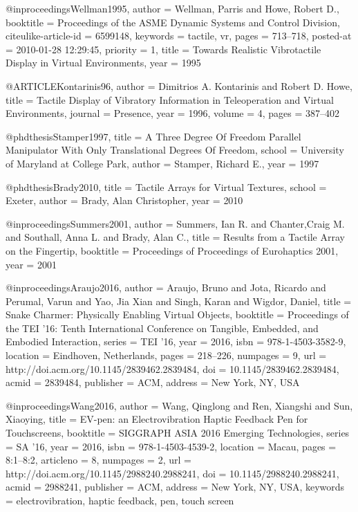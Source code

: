 @inproceedings{Wellman1995,
    author = {Wellman, Parris  and Howe, Robert D.},
    booktitle = {Proceedings of the ASME Dynamic Systems and Control Division},
    citeulike-article-id = {6599148},
    keywords = {tactile, vr},
    pages = {713--718},
    posted-at = {2010-01-28 12:29:45},
    priority = {1},
    title = {{Towards Realistic Vibrotactile Display in Virtual Environments}},
    year = {1995}
}

@ARTICLE{Kontarinis96,
    author = {Dimitrios A. Kontarinis and Robert D. Howe},
    title = {{Tactile Display of Vibratory Information in Teleoperation and Virtual Environments}},
    journal = {Presence},
    year = {1996},
    volume = {4},
    pages = {387--402}
}

@phdthesis{Stamper1997,
    title    = {{A Three Degree Of Freedom Parallel Manipulator With Only Translational Degrees Of Freedom}},
    school   = {University of Maryland at College Park},
    author   = {Stamper, Richard E.},
    year     = {1997}
}

@phdthesis{Brady2010,
    title    = {{Tactile Arrays for Virtual Textures}},
    school   = {Exeter},
    author   = {Brady, Alan Christopher},
    year     = {2010}
}

@inproceedings{Summers2001,
 author = {Summers, Ian R. and Chanter,Craig M. and Southall, Anna L. and Brady, Alan C.},
 title = {{Results from a Tactile Array on the Fingertip}},
 booktitle = {Proceedings of Proceedings of Eurohaptics 2001},
 year = {2001}
} 

@inproceedings{Araujo2016,
 author = {Araujo, Bruno and Jota, Ricardo and Perumal, Varun and Yao, Jia Xian and Singh, Karan and Wigdor, Daniel},
 title = {{Snake Charmer: Physically Enabling Virtual Objects}},
 booktitle = {Proceedings of the TEI '16: Tenth International Conference on Tangible, Embedded, and Embodied Interaction},
 series = {TEI '16},
 year = {2016},
 isbn = {978-1-4503-3582-9},
 location = {Eindhoven, Netherlands},
 pages = {218--226},
 numpages = {9},
 url = {http://doi.acm.org/10.1145/2839462.2839484},
 doi = {10.1145/2839462.2839484},
 acmid = {2839484},
 publisher = {ACM},
 address = {New York, NY, USA}
} 

@inproceedings{Wang2016,
 author = {Wang, Qinglong and Ren, Xiangshi and Sun, Xiaoying},
 title = {{EV-pen: an Electrovibration Haptic Feedback Pen for Touchscreens}},
 booktitle = {SIGGRAPH ASIA 2016 Emerging Technologies},
 series = {SA '16},
 year = {2016},
 isbn = {978-1-4503-4539-2},
 location = {Macau},
 pages = {8:1--8:2},
 articleno = {8},
 numpages = {2},
 url = {http://doi.acm.org/10.1145/2988240.2988241},
 doi = {10.1145/2988240.2988241},
 acmid = {2988241},
 publisher = {ACM},
 address = {New York, NY, USA},
 keywords = {electrovibration, haptic feedback, pen, touch screen}
} 

